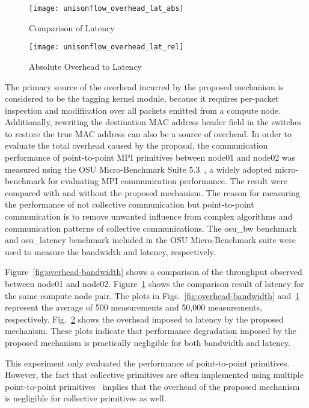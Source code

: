 \begin{figure}
    \centering
    \texttt{[image: unisonflow\_overhead\_lat\_abs]}
    \caption{Comparison of Latency}%
    \label{fig:overhead-latency}
\end{figure}

\begin{figure}
    \centering
    \texttt{[image: unisonflow\_overhead\_lat\_rel]}
    \caption{Absolute Overhead to Latency}%
    \label{fig:overhead-latency-2}
\end{figure}

The primary source of the overhead incurred by the proposed mechanism is
considered to be the tagging kernel module, because it requires
per-packet inspection and modification over all packets emitted from a
compute node. Additionally, rewriting the destination MAC address
header field in the switches to restore the true MAC address can also be
a source of overhead. In order to evaluate the total overhead caused by
the proposal, the communication performance of point-to-point MPI primitives
between node01 and node02 was measured using the OSU Micro-Benchmark Suite
5.3~\autocite{omb}, a widely adopted micro-benchmark for evaluating MPI
communication performance. The result were compared  with and without the
proposed mechanism. The reason for measuring the performance of not collective
communication but point-to-point communication is to remove unwanted influence
from complex algorithms and communication patterns of collective
communications. The osu\_bw benchmark and osu\_latency benchmark included in
the OSU Micro-Benchmark suite were used to measure the bandwidth and latency,
respectively.

Figure~\ref{fig:overhead-bandwidth} shows a comparison of the throughput
observed between node01 and node02. Figure~\ref{fig:overhead-latency} shows
the comparison result of latency for the same compute node pair. The plots in
Figs.~\ref{fig:overhead-bandwidth} and~\ref{fig:overhead-latency} represent
the average of 500 measurements and 50,000 measurements, respectively.
Fig.~\ref{fig:overhead-latency-2} shows the overhead imposed to latency by the
proposed mechanism. These plots indicate that performance degradation imposed
by the proposed mechanism is practically negligible for both bandwidth and
latency.

This experiment only evaluated the performance of point-to-point
primitives. However, the fact that collective primitives are often
implemented using multiple point-to-point
primitives~\autocite{Squyres2005,mvapich} implies that the overhead
of the proposed mechanism is negligible for collective primitives as
well.

